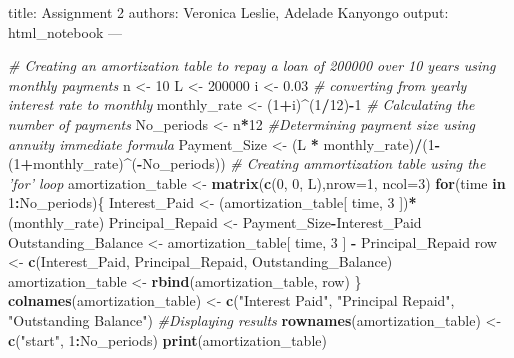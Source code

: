 \documentclass[]{article}
\title{}
\author{}
\date{}
\newenvironment{Shaded}{\begin{snugshade}}{\end{snugshade}}
\newcommand{\CommentTok}[1]{\textcolor[rgb]{0.56,0.35,0.01}{\textit{#1}}}
\newcommand{\ControlFlowTok}[1]{\textcolor[rgb]{0.13,0.29,0.53}{\textbf{#1}}}
\newcommand{\DataTypeTok}[1]{\textcolor[rgb]{0.13,0.29,0.53}{#1}}
\newcommand{\DecValTok}[1]{\textcolor[rgb]{0.00,0.00,0.81}{#1}}
\newcommand{\FloatTok}[1]{\textcolor[rgb]{0.00,0.00,0.81}{#1}}
\newcommand{\KeywordTok}[1]{\textcolor[rgb]{0.13,0.29,0.53}{\textbf{#1}}}
\newcommand{\NormalTok}[1]{#1}
\newcommand{\OperatorTok}[1]{\textcolor[rgb]{0.81,0.36,0.00}{\textbf{#1}}}
\newcommand{\StringTok}[1]{\textcolor[rgb]{0.31,0.60,0.02}{#1}}
\begin{document}
title: Assignment 2 authors: Veronica Leslie, Adelade Kanyongo output:
html\_notebook ---

\begin{Shaded}
\begin{Highlighting}[]
\CommentTok{# Creating an amortization table to repay a loan of 200000 over 10 years using monthly payments}
\NormalTok{n <-}\StringTok{ }\DecValTok{10}
\NormalTok{L <-}\StringTok{ }\DecValTok{200000}
\NormalTok{i <-}\StringTok{ }\FloatTok{0.03}
\CommentTok{# converting from yearly interest rate to monthly}
\NormalTok{monthly_rate <-}\StringTok{ }\NormalTok{(}\DecValTok{1}\OperatorTok{+}\NormalTok{i)}\OperatorTok{^}\NormalTok{(}\DecValTok{1}\OperatorTok{/}\DecValTok{12}\NormalTok{)}\OperatorTok{-}\DecValTok{1}
\CommentTok{# Calculating the number of payments}
\NormalTok{No_periods <-}\StringTok{ }\NormalTok{n}\OperatorTok{*}\DecValTok{12}
\CommentTok{#Determining payment size using annuity immediate formula}
\NormalTok{Payment_Size <-}\StringTok{ }\NormalTok{(L }\OperatorTok{*}\StringTok{ }\NormalTok{monthly_rate)}\OperatorTok{/}\NormalTok{(}\DecValTok{1}\OperatorTok{-}\NormalTok{(}\DecValTok{1}\OperatorTok{+}\NormalTok{monthly_rate)}\OperatorTok{^}\NormalTok{(}\OperatorTok{-}\NormalTok{No_periods))}
\CommentTok{# Creating ammortization table using the 'for' loop}
\NormalTok{amortization_table <-}\StringTok{ }\KeywordTok{matrix}\NormalTok{(}\KeywordTok{c}\NormalTok{(}\DecValTok{0}\NormalTok{, }\DecValTok{0}\NormalTok{, L),}\DataTypeTok{nrow=}\DecValTok{1}\NormalTok{, }\DataTypeTok{ncol=}\DecValTok{3}\NormalTok{)}
\ControlFlowTok{for}\NormalTok{(time }\ControlFlowTok{in} \DecValTok{1}\OperatorTok{:}\NormalTok{No_periods)\{}
\NormalTok{  Interest_Paid <-}\StringTok{ }\NormalTok{(amortization_table[ time, }\DecValTok{3}\NormalTok{ ])}\OperatorTok{*}\NormalTok{(monthly_rate)}
\NormalTok{  Principal_Repaid <-}\StringTok{ }\NormalTok{Payment_Size}\OperatorTok{-}\NormalTok{Interest_Paid}
\NormalTok{  Outstanding_Balance <-}\StringTok{ }\NormalTok{amortization_table[ time, }\DecValTok{3}\NormalTok{ ] }\OperatorTok{-}\StringTok{ }\NormalTok{Principal_Repaid}
\NormalTok{  row <-}\StringTok{ }\KeywordTok{c}\NormalTok{(Interest_Paid, Principal_Repaid, Outstanding_Balance)}
\NormalTok{  amortization_table <-}\StringTok{ }\KeywordTok{rbind}\NormalTok{(amortization_table, row)}
\NormalTok{\}}
\KeywordTok{colnames}\NormalTok{(amortization_table) <-}\StringTok{ }\KeywordTok{c}\NormalTok{(}\StringTok{"Interest Paid"}\NormalTok{, }\StringTok{"Principal Repaid"}\NormalTok{, }\StringTok{"Outstanding Balance"}\NormalTok{)}
\CommentTok{#Displaying results }
\KeywordTok{rownames}\NormalTok{(amortization_table) <-}\StringTok{ }\KeywordTok{c}\NormalTok{(}\StringTok{"start"}\NormalTok{, }\DecValTok{1}\OperatorTok{:}\NormalTok{No_periods)}
\KeywordTok{print}\NormalTok{(amortization_table)}
\end{Highlighting}
\end{Shaded}
\end{document}
